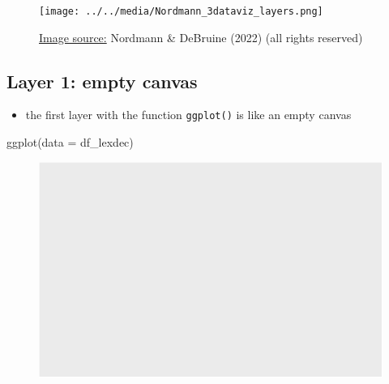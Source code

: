\documentclass[
  letterpaper,
  DIV=11]{scrartcl}
\newenvironment{Shaded}{\begin{snugshade}}{\end{snugshade}}
\newcommand{\AttributeTok}[1]{\textcolor[rgb]{0.40,0.45,0.13}{#1}}
\newcommand{\FunctionTok}[1]{\textcolor[rgb]{0.28,0.35,0.67}{#1}}
\newcommand{\NormalTok}[1]{\textcolor[rgb]{0.00,0.23,0.31}{#1}}
\providecommand{\tightlist}{%
  \setlength{\itemsep}{0pt}\setlength{\parskip}{0pt}}\usepackage{longtable,booktabs,array}
\theoremstyle{definition}
\theoremstyle{remark}
\begin{document}
\begin{figure}

{\centering \texttt{[image: ../../media/Nordmann\_3dataviz\_layers.png]}

}

\caption{\href{https://psyteachr.github.io/ads-v2/03-viz.html}{Image
source:} Nordmann \& DeBruine (2022) (all rights reserved)}

\end{figure}

\hypertarget{layer-1-empty-canvas}{%
\subsection{Layer 1: empty canvas}\label{layer-1-empty-canvas}}

\begin{itemize}
\tightlist
\item
  the first layer with the function \texttt{ggplot()} is like an empty
  canvas
\end{itemize}

\begin{Shaded}
\begin{Highlighting}[]
\FunctionTok{ggplot}\NormalTok{(}\AttributeTok{data =}\NormalTok{ df\_lexdec)}
\end{Highlighting}
\end{Shaded}

\begin{figure}[H]

{\centering \includegraphics{_intro_r_slides_files/figure-pdf/unnamed-chunk-16-1.pdf}

}

\end{figure}
\end{document}
